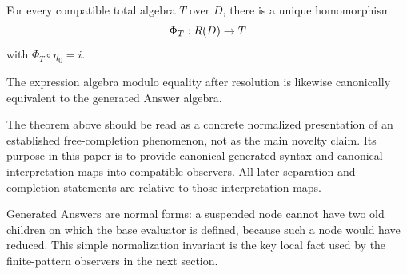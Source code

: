 \begin{theorem}\label{thm:free-completion}
For every compatible total algebra $T$ over $D$, there is a unique homomorphism
\[
 \Phi_T:R(D)\to T
\]
with $\Phi_T\circ\eta_0=i$.
\end{theorem}

The expression algebra modulo equality after resolution is likewise
canonically equivalent to the generated Answer algebra.

\begin{remark}[Positioning]
The theorem above should be read as a concrete normalized presentation of an
established free-completion phenomenon, not as the main novelty claim.  Its
purpose in this paper is to provide canonical generated syntax and canonical
interpretation maps into compatible observers.  All later separation and
completion statements are relative to those interpretation maps.
\end{remark}

Generated Answers are normal forms: a suspended node cannot have two old
children on which the base evaluator is defined, because such a node would have
reduced.  This simple normalization invariant is the key local fact used by the
finite-pattern observers in the next section.
